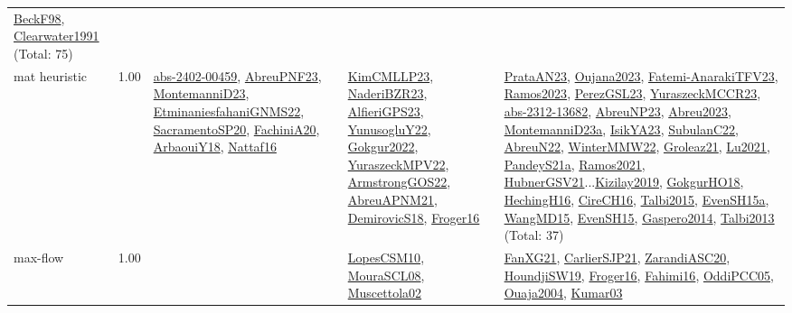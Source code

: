 {\begin{longtable}{p{3cm}r>{\raggedright\arraybackslash}p{6cm}>{\raggedright\arraybackslash}p{6cm}>{\raggedright\arraybackslash}p{8cm}}
\hyperref[detail:BeckF98]{BeckF98}, \hyperref[detail:Clearwater1991]{Clearwater1991} (Total: 75)\\
\index{mat heuristic}\index{Algorithms!mat heuristic}mat heuristic &  1.00 & \hyperref[detail:abs-2402-00459]{abs-2402-00459}, \hyperref[detail:AbreuPNF23]{AbreuPNF23}, \hyperref[detail:MontemanniD23]{MontemanniD23}, \hyperref[detail:EtminaniesfahaniGNMS22]{EtminaniesfahaniGNMS22}, \hyperref[detail:SacramentoSP20]{SacramentoSP20}, \hyperref[detail:FachiniA20]{FachiniA20}, \hyperref[detail:ArbaouiY18]{ArbaouiY18}, \hyperref[detail:Nattaf16]{Nattaf16} & \hyperref[detail:KimCMLLP23]{KimCMLLP23}, \hyperref[detail:NaderiBZR23]{NaderiBZR23}, \hyperref[detail:AlfieriGPS23]{AlfieriGPS23}, \hyperref[detail:YunusogluY22]{YunusogluY22}, \hyperref[detail:Gokgur2022]{Gokgur2022}, \hyperref[detail:YuraszeckMPV22]{YuraszeckMPV22}, \hyperref[detail:ArmstrongGOS22]{ArmstrongGOS22}, \hyperref[detail:AbreuAPNM21]{AbreuAPNM21}, \hyperref[detail:DemirovicS18]{DemirovicS18}, \hyperref[detail:Froger16]{Froger16} & \hyperref[detail:PrataAN23]{PrataAN23}, \hyperref[detail:Oujana2023]{Oujana2023}, \hyperref[detail:Fatemi-AnarakiTFV23]{Fatemi-AnarakiTFV23}, \hyperref[detail:Ramos2023]{Ramos2023}, \hyperref[detail:PerezGSL23]{PerezGSL23}, \hyperref[detail:YuraszeckMCCR23]{YuraszeckMCCR23}, \hyperref[detail:abs-2312-13682]{abs-2312-13682}, \hyperref[detail:AbreuNP23]{AbreuNP23}, \hyperref[detail:Abreu2023]{Abreu2023}, \hyperref[detail:MontemanniD23a]{MontemanniD23a}, \hyperref[detail:IsikYA23]{IsikYA23}, \hyperref[detail:SubulanC22]{SubulanC22}, \hyperref[detail:AbreuN22]{AbreuN22}, \hyperref[detail:WinterMMW22]{WinterMMW22}, \hyperref[detail:Groleaz21]{Groleaz21}, \hyperref[detail:Lu2021]{Lu2021}, \hyperref[detail:PandeyS21a]{PandeyS21a}, \hyperref[detail:Ramos2021]{Ramos2021}, \hyperref[detail:HubnerGSV21]{HubnerGSV21}...\hyperref[detail:Kizilay2019]{Kizilay2019}, \hyperref[detail:GokgurHO18]{GokgurHO18}, \hyperref[detail:HechingH16]{HechingH16}, \hyperref[detail:CireCH16]{CireCH16}, \hyperref[detail:Talbi2015]{Talbi2015}, \hyperref[detail:EvenSH15a]{EvenSH15a}, \hyperref[detail:WangMD15]{WangMD15}, \hyperref[detail:EvenSH15]{EvenSH15}, \hyperref[detail:Gaspero2014]{Gaspero2014}, \hyperref[detail:Talbi2013]{Talbi2013} (Total: 37)\\
\index{max-flow}\index{Algorithms!max-flow}max-flow &  1.00 &  & \hyperref[detail:LopesCSM10]{LopesCSM10}, \hyperref[detail:MouraSCL08]{MouraSCL08}, \hyperref[detail:Muscettola02]{Muscettola02} & \hyperref[detail:FanXG21]{FanXG21}, \hyperref[detail:CarlierSJP21]{CarlierSJP21}, \hyperref[detail:ZarandiASC20]{ZarandiASC20}, \hyperref[detail:HoundjiSW19]{HoundjiSW19}, \hyperref[detail:Froger16]{Froger16}, \hyperref[detail:Fahimi16]{Fahimi16}, \hyperref[detail:OddiPCC05]{OddiPCC05}, \hyperref[detail:Ouaja2004]{Ouaja2004}, \hyperref[detail:Kumar03]{Kumar03}\\

\end{longtable}}
